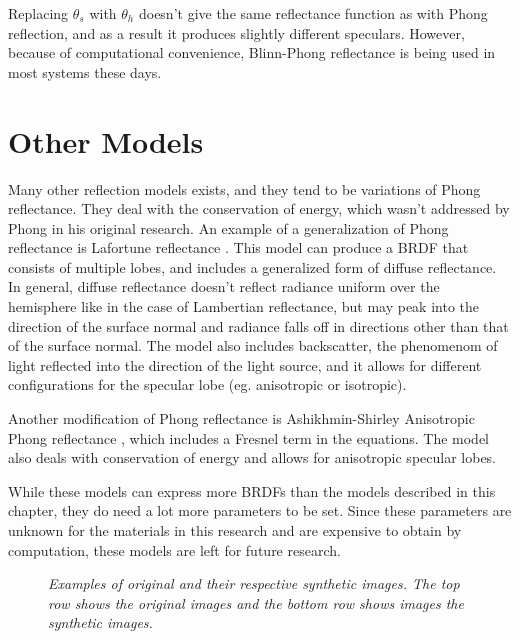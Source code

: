 Replacing $\theta_s$ with $\theta_h$ doesn't give the same reflectance function as with Phong reflection, and as a result it produces slightly different speculars. However, because of computational convenience, Blinn-Phong reflectance is being used in most systems these days.

	\section{Other Models}\label{sec:Other}
		Many other reflection models exists, and they tend to be variations of Phong reflectance. They deal with the conservation of energy, which wasn't addressed by Phong in his original research. An example of a generalization of Phong reflectance is Lafortune reflectance \cite{Lafortune}. This model can produce a BRDF that consists of multiple lobes, and includes a generalized form of diffuse reflectance. In general, diffuse reflectance doesn't reflect radiance uniform over the hemisphere like in the case of Lambertian reflectance, but may peak into the direction of the surface normal and radiance falls off in directions other than that of the surface normal. The model also includes backscatter, the phenomenom of light reflected into the direction of the light source, and it allows for different configurations for the specular lobe (eg. anisotropic or isotropic).

Another modification of Phong reflectance is Ashikhmin-Shirley Anisotropic Phong reflectance \cite{AshikhminShirley}, which includes a Fresnel term in the equations. The model also deals with conservation of energy and allows for anisotropic specular lobes.

While these models can express more BRDFs than the models described in this chapter, they do need a lot more parameters to be set. Since these parameters are unknown for the materials in this research and are expensive to obtain by computation, these models are left for future research.

\begin{figure}[htbp!]
	\begin{center}

	\end{center}
	\caption{{\it Examples of original and their respective synthetic images. The top row shows the original images and the bottom row shows images the synthetic images.}}
	\label{fig:RenderExamples1}
\end{figure}

